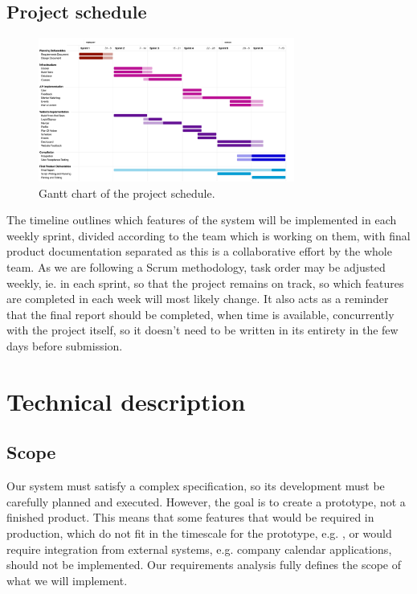 \documentclass[10pt]{article}
\begin{document}
\subsection{Project schedule}
\begin{figure}[H]
    \centering
    \includegraphics[width=0.75\textwidth]{Timetable}
    \caption{Gantt chart of the project schedule.}
    \label{fig:project_schedule_gantt}
\end{figure}

The timeline outlines which features of the system will be implemented in each
weekly sprint, divided according to the team which is working on them, with
final product documentation separated as this is a collaborative effort by the
whole team. As we are following a Scrum methodology, task order may be adjusted
weekly, ie. in each sprint, so that the project remains on track, so which
features are completed in each week will most likely change. It also acts as a
reminder that the final report should be completed, when time is available,
concurrently with the project itself, so it doesn't need to be written in its
entirety in the few days before submission.


\section{Technical description}

\subsection{Scope}
Our system must satisfy a complex specification, so its development must be
carefully planned and executed. However, the goal is to create a prototype, not
a finished product. This means that some features that would be required in
production, which do not fit in the timescale for the prototype, e.g. , or would
require integration from external systems, e.g. company calendar applications,
should not be implemented. Our requirements analysis fully defines the scope of
what we will implement.
\end{document}
